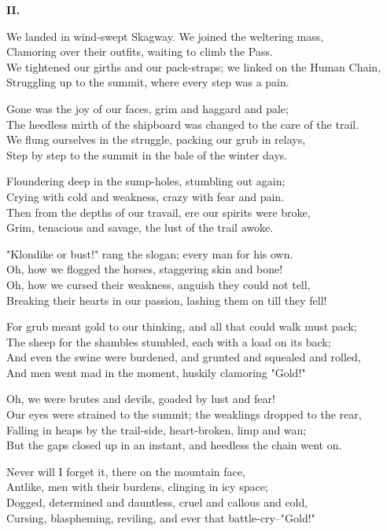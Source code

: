 \begin{poemblock}
\textbf{II.}

We landed in wind-swept Skagway.  We joined the weltering mass,\\
Clamoring over their outfits, waiting to climb the Pass.\\
We tightened our girths and our pack-straps; we linked on the Human Chain,\\
Struggling up to the summit, where every step was a pain.

Gone was the joy of our faces, grim and haggard and pale;\\
The heedless mirth of the shipboard was changed to the care of the trail.\\
We flung ourselves in the struggle, packing our grub in relays,\\
Step by step to the summit in the bale of the winter days.

Floundering deep in the sump-holes, stumbling out again;\\
Crying with cold and weakness, crazy with fear and pain.\\
Then from the depths of our travail, ere our spirits were broke,\\
Grim, tenacious and savage, the lust of the trail awoke.

"Klondike or bust!" rang the slogan; every man for his own.\\
Oh, how we flogged the horses, staggering skin and bone!\\
Oh, how we cursed their weakness, anguish they could not tell,\\
Breaking their hearts in our passion, lashing them on till they fell!

For grub meant gold to our thinking, and all that could walk must pack;\\
The sheep for the shambles stumbled, each with a load on its back;\\
And even the swine were burdened, and grunted and squealed and rolled,\\
And men went mad in the moment, huskily clamoring "Gold!"

Oh, we were brutes and devils, goaded by lust and fear!\\
Our eyes were strained to the summit; the weaklings dropped to the rear,\\
Falling in heaps by the trail-side, heart-broken, limp and wan;\\
But the gaps closed up in an instant, and heedless the chain went on.

Never will I forget it, there on the mountain face,\\
Antlike, men with their burdens, clinging in icy space;\\
Dogged, determined and dauntless, cruel and callous and cold,\\
Cursing, blaspheming, reviling, and ever that battle-cry--"Gold!"


\end{poemblock}
